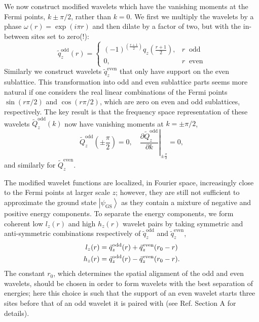 \documentclass[aps,prl,twocolumn,showpacs,superscriptaddress,floatfix,10pt]{revtex4-1}
\begin{document}
We now construct modified wavelets which have the vanishing moments 
at the Fermi points, $k \pm \pi/2$, rather than $k=0$.
We first we multiply the wavelets by
a phase $\omega(r)=\exp(i\pi r)$ and then dilate by a factor of two, but with the 
in-between sites set to zero(!):
\begin{equation}
\tilde q_z^{{\text{odd}}}(r) = \left\{ {\begin{array}{*{20}{l}}
  {{{\left( { - 1} \right)}^{\left( {\tfrac{{r + 1}}{2}} \right)}}{q_z}\left( {\tfrac{{r + 1}}{2}} \right),}&{r\;\; \textrm{odd}} \\ 
  {0,}&{r\;\; \textrm{even}} 
\end{array}} \right. \label{eq:9}
\end{equation}
Similarly we construct wavelets $\tilde q_z^{{\text{even}}}$ that only 
have support on the even sublattice. 
This transformation into odd and even sublattice parts seems more natural if one considers the 
real linear combinations of the Fermi points $\sin (r \pi/2)$ and $\cos (r \pi/2)$, which are 
zero on even and odd sublattices, respectively.
The key result is that the 
frequency space representation of these 
wavelets $\tilde Q_z^{{\text{odd}}}(k)$ now have vanishing moments at $k = \pm \pi/2$,
\begin{equation}
{{\tilde Q}_z^\textrm{odd}}\left( { \pm \frac{\pi }{2}} \right) = 0,\quad {\left. {\frac{{{\partial  }{{\tilde Q}_z^\textrm{odd}}}}{{\partial {k  }}}} \right|_{ \pm \tfrac{\pi}{2}}} = 0, \label{eq:10}
\end{equation}
and similarly for $\tilde Q_z^{{\text{even}}}$. 

The modified wavelet functions are localized, in Fourier space, increasingly
close to the Fermi points at larger scale $z$; however, they are still not
sufficient to approximate the ground state 
$\left| {{\psi _\textrm{GS}}} \right\rangle$ as they contain a mixture of negative and
positive energy components. To separate the energy components, we form coherent
low $l_z(r)$ and high ${h_z}(r)$ wavelet pairs by taking 
symmetric and anti-symmetric combinations respectively of $\tilde q_z^{{\text{odd}}}$ and $\tilde q_z^{{\text{even}}}$,
\begin{align}
  {l_z}(r) &= {{\tilde q}_z^\textrm{odd}}(r) + {{\tilde q^\textrm{even}}_z}({r_0} - r) \hfill \nonumber \\
  {h_z}(r) &= {{\tilde q}_z^\textrm{odd}}(r) - {{\tilde q^\textrm{even}}_z}({r_0} - r) \hfill. \label{eq:11}
\end{align}
The constant $r_0$, which determines the spatial alignment of the odd and even
wavelets, should be chosen in order to form wavelets with the best separation of energies; here this choice is such that the
support of an even wavelet starts three sites before that of an odd wavelet it is paired with (see Ref.\cite{Supp} Section A for details).
\end{document}
